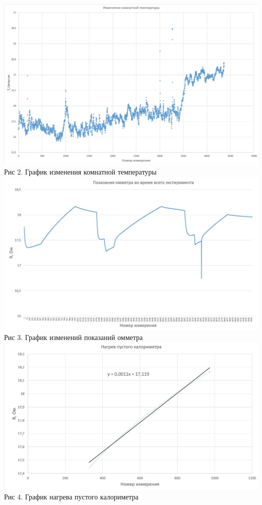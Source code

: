 \documentclass[a4paper, 12pt]{article}
\begin{document}
 	\begin{center}
 		\includegraphics[width=15cm]{"График1.jpg"}\\
 		Рис 2. График изменения комнатной температуры 
 		\includegraphics[width=15cm]{"График2.jpg"}\\
 		Рис 3. График изменений показаний омметра 
 		\includegraphics[width=15cm]{"Нагрев пустого.jpg"}\\
 		Рис 4. График нагрева пустого калориметра


\end{center}
\end{document}
